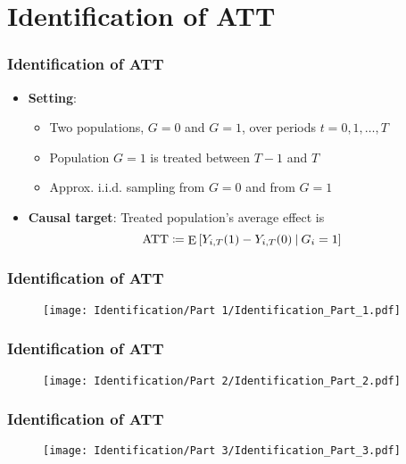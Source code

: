 \documentclass[table, xcolor = {dvipsnames}, 9pt]{beamer}
\newcommand\given[1][]{\:#1\vert\:}
\theoremstyle{plain}
\DeclareMathOperator{\E}{\rm{E}}
\begin{document}
\section{Identification of ATT}
\begin{frame}[t]
\frametitle{Identification of ATT}
\vfill
\begin{itemize}
\item \textcolor{Dark2-A}{\textbf{Setting}}: \vfill
\begin{itemize}
\item Two populations, $G = 0$ and $G = 1$, over periods $t = 0, 1, \ldots , T$ \vfill
\item Population $G = 1$ is treated between $T - 1$ and $T$ \vfill
\item Approx. \textrm{i.i.d.} sampling from $G = 0$ and from $G = 1$ \vfill
\end{itemize}
\item \textcolor{Dark2-A}{\textbf{Causal target}}: Treated population's average effect is \vfill
\begin{equation*}
\textrm{ATT} \coloneqq \E\left[Y_{i,T}(1) - Y_{i,T}(0) \given G_i = 1\right]
\end{equation*} \vfill
\end{itemize}
\vfill
\end{frame}
\begin{frame}[t]
\frametitle{Identification of ATT}
\vfill
\begin{figure}
\texttt{[image: Identification/Part 1/Identification\_Part\_1.pdf]}
\end{figure}
\vfill
\end{frame}
\begin{frame}[t]
\frametitle{Identification of ATT}
\vfill
\begin{figure}
\texttt{[image: Identification/Part 2/Identification\_Part\_2.pdf]}
\end{figure}
\vfill
\end{frame}
\begin{frame}[t]
\frametitle{Identification of ATT}
\vfill
\begin{figure}
\texttt{[image: Identification/Part 3/Identification\_Part\_3.pdf]}
\end{figure}
\vfill
\end{frame}
\end{document}
